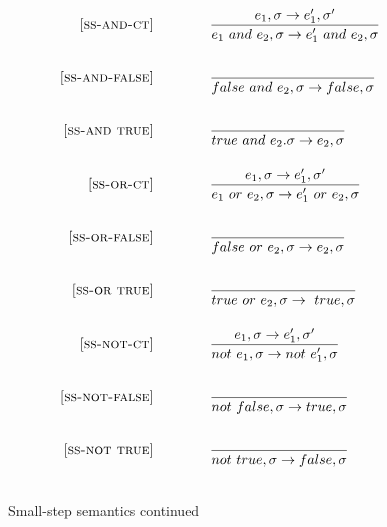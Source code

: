 \documentclass{article}
\begin{document}
\begin{figure}\label{fig:smallstep_cont}
\caption{Small-step semantics continued}

\[
\begin{array}{r@{\qquad\qquad}l}
\ssrule{ss-and-ct}
{e_1,\sigma \rightarrow e_1',\sigma'}
{e_1 ~and~ e_2, \sigma \rightarrow e_1' ~and~ e_2,\sigma}

\ssrule{ss-and-false}
{}
{false ~and ~e_2,\sigma \rightarrow false,\sigma}

\ssrule{ss-and true}
{}
{true ~and ~e_2. \sigma \rightarrow e_2,\sigma}

\ssrule{ss-or-ct}
{e_1,\sigma \rightarrow e_1',\sigma'}
{e_1 ~or~ e_2, \sigma \rightarrow e_1' ~or~ e_2,\sigma}

\ssrule{ss-or-false}
{}
{false ~or ~e_2,\sigma \rightarrow e_2,\sigma}

\ssrule{ss-or true}
{}
{true ~or ~e_2, \sigma \rightarrow ~true,\sigma}

\ssrule{ss-not-ct}
{e_1,\sigma \rightarrow e_1',\sigma'}
{not~ e_1, \sigma \rightarrow not~ e_1',\sigma}

\ssrule{ss-not-false}
{}
{not ~false ,\sigma \rightarrow true,\sigma}

\ssrule{ss-not true}
{}
{not ~true  ,\sigma \rightarrow false,\sigma}

\end{array}
\]


\end{figure}
\end{document}
